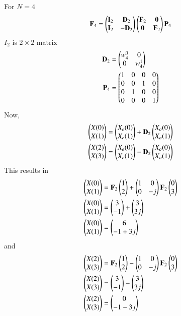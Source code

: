 \documentclass[journal,12pt,twocolumn]{IEEEtran}
\begin{document}
For $N=4$
\begin{align}
    \vec{F}_4=\myvec{\vec{I}_2 & \vec{D}_{2} \\ \vec{I}_{2} & -\vec{D}_{2}}\myvec{\vec{F}_{2} & \vec{0} \\ \vec{0} & \vec{F}_{2}}\vec{P}_4
\end{align}
$I_{2}$ is $2\times 2$ matrix
\begin{align}
    \vec{D}_2 & =\myvec{w_4^0 & 0\\0 & w_4^1}\\
    \vec{P}_4 & =\myvec{1&0&0&0\\0&0&1&0\\0&1&0&0\\0&0&0&1}
\end{align}
Now,
\begin{align}
    \myvec{X(0)\\X(1)}&=\myvec{X_e(0)\\X_e(1)}+\vec{D}_2\myvec{X_o(0)\\X_o(1)}\\
    \myvec{X(2)\\X(3)}&=\myvec{X_e(0)\\X_e(1)}-\vec{D}_2\myvec{X_o(0)\\X_o(1)}
\end{align}
This results in
\begin{align}
    \myvec{X(0)\\X(1)} & =\vec{F}_2\myvec{1\\2}+\myvec{1&0\\0&-j}\vec{F}_2\myvec{0\\3}\\    
    \myvec{X(0)\\X(1)} & =\myvec{3\\-1}+\myvec{3\\3j}\\
    \myvec{X(0)\\X(1)} & =\myvec{6\\-1+3j}
\end{align}
and
\begin{align}
    \myvec{X(2)\\X(3)}&=\vec{F}_2\myvec{1\\2}-\myvec{1&0\\0&-j}\vec{F}_2\myvec{0\\3}\\    
    \myvec{X(2)\\X(3)}&=\myvec{3\\-1}-\myvec{3\\3j}\\
    \myvec{X(2)\\X(3)}&=\myvec{0\\-1-3j}
\end{align}
\end{document}
